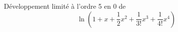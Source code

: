  D{\'e}veloppement limit{\'e} {\`a} l'ordre 5 en 0 de
\[\ln(1+x+\frac{1}{2}x^2+\frac{1}{3!}x^3+\frac{1}{4!}x^4)\]\bigskip
\bigskip 